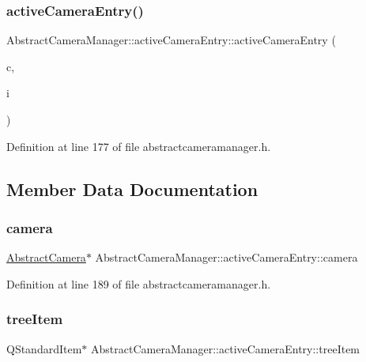 \subsubsection{\texorpdfstring{activeCameraEntry()}{activeCameraEntry()}}
{\footnotesize\ttfamily Abstract\+Camera\+Manager\+::active\+Camera\+Entry\+::active\+Camera\+Entry (\begin{DoxyParamCaption}\item[{\mbox{\hyperlink{class_abstract_camera}{Abstract\+Camera}} $\ast$}]{c,  }\item[{Q\+Standard\+Item $\ast$}]{i }\end{DoxyParamCaption})\hspace{0.3cm}{\ttfamily [inline]}}



Definition at line 177 of file abstractcameramanager.\+h.



\subsection{Member Data Documentation}
\mbox{\label{struct_abstract_camera_manager_1_1active_camera_entry_ac03f9c68e2f8fd20f100512780f45cbb}} 
\subsubsection{\texorpdfstring{camera}{camera}}
{\footnotesize\ttfamily \mbox{\hyperlink{class_abstract_camera}{Abstract\+Camera}}$\ast$ Abstract\+Camera\+Manager\+::active\+Camera\+Entry\+::camera}



Definition at line 189 of file abstractcameramanager.\+h.

\mbox{\label{struct_abstract_camera_manager_1_1active_camera_entry_add95e09b5b0c854f15cbf73311f9ffb1}} 
\subsubsection{\texorpdfstring{treeItem}{treeItem}}
{\footnotesize\ttfamily Q\+Standard\+Item$\ast$ Abstract\+Camera\+Manager\+::active\+Camera\+Entry\+::tree\+Item}



